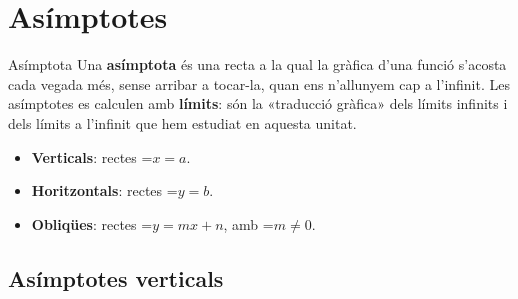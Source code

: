 \documentclass[11pt,a4paper]{article}
\newcommand{\fmm}[1]{\setbox0=\hbox{$#1$}\ifdim\wd0>\linewidth\[#1\]\else\mbox{\box0}\fi}
\begin{document}
  
\section{Asímptotes}\hypertarget{sec10}{}

  

  
\begin{fmdef}{Asímptota}
Una \textbf{asímptota} és una recta a la qual la gràfica d'una funció s'acosta cada vegada més, sense arribar a tocar-la, quan ens n'allunyem cap a l'infinit. Les asímptotes es calculen amb \textbf{límits}: són la «traducció gràfica» dels límits infinits i dels límits a l'infinit que hem estudiat en aquesta unitat.

      
\begin{itemize}
\item \textbf{Verticals}: rectes \fmm{x=a}.
\item \textbf{Horitzontals}: rectes \fmm{y=b}.
\item \textbf{Obliqües}: rectes \fmm{y=mx+n}, amb \fmm{m\neq0}.
\end{itemize}
\end{fmdef}

  
\subsection*{Asímptotes verticals}
\end{document}
